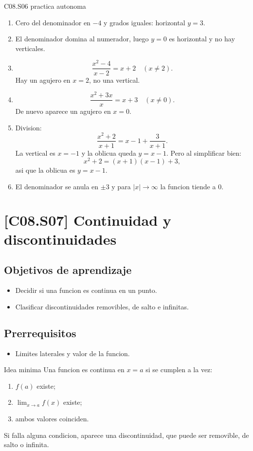 \begin{fullsolution}{C08.S06 practica autonoma}
\begin{enumerate}[label=\textbf{PX-C08.S06-\arabic*:}, leftmargin=*]
  \item Cero del denominador en \(-4\) y grados iguales: horizontal \(y=3\).
  \item El denominador domina al numerador, luego \(y=0\) es horizontal y no hay verticales.
  \item
  \[
  \frac{x^2-4}{x-2}=x+2 \quad (x\neq 2).
  \]
  Hay un agujero en \(x=2\), no una vertical.
  \item
  \[
  \frac{x^2+3x}{x}=x+3\quad (x\neq 0).
  \]
  De nuevo aparece un agujero en \(x=0\).
  \item Division:
  \[
  \frac{x^2+2}{x+1}=x-1+\frac{3}{x+1}.
  \]
  La vertical es \(x=-1\) y la oblicua queda \(y=x-1\). Pero al simplificar bien:
  \[
  x^2+2=(x+1)(x-1)+3,
  \]
  asi que la oblicua es \(y=x-1\).
  \item El denominador se anula en \(\pm 3\) y para \(|x|\to\infty\) la funcion tiende a \(0\).
\end{enumerate}
\end{fullsolution}

\section{[C08.S07] Continuidad y discontinuidades}

\subsection*{Objetivos de aprendizaje}
\begin{itemize}
  \item Decidir si una funcion es continua en un punto.
  \item Clasificar discontinuidades removibles, de salto e infinitas.
\end{itemize}

\subsection*{Prerrequisitos}
\begin{itemize}
  \item Limites laterales y valor de la funcion.
\end{itemize}

\begin{theorybox}{Idea minima}
Una funcion es continua en \(x=a\) si se cumplen a la vez:
\begin{enumerate}
  \item \(f(a)\) existe;
  \item \(\lim_{x\to a}f(x)\) existe;
  \item ambos valores coinciden.
\end{enumerate}
Si falla alguna condicion, aparece una discontinuidad, que puede ser removible, de salto o
infinita.
\end{theorybox}

